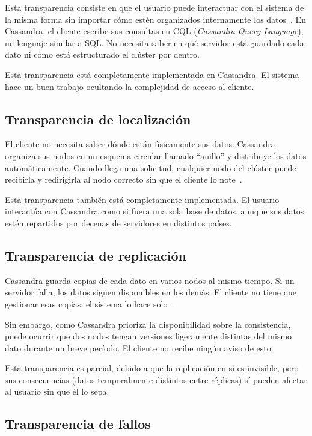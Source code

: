 \documentclass[12pt, a4paper]{article}
\begin{document}
Esta transparencia consiste en que el usuario puede interactuar con el
sistema de la misma forma sin importar cómo estén organizados
internamente los datos~\cite{tanenbaum2007}. En Cassandra, el cliente
escribe sus consultas en CQL (\textit{Cassandra Query Language}), un
lenguaje similar a SQL. No necesita saber en qué servidor está guardado
cada dato ni cómo está estructurado el clúster por dentro.

Esta transparencia está completamente implementada en
Cassandra. El sistema hace un buen trabajo ocultando la complejidad de acceso al cliente.

\newpage
\subsection{Transparencia de localización}

El cliente no necesita saber dónde están físicamente sus datos.
Cassandra organiza sus nodos en un esquema circular llamado ``anillo''
y distribuye los datos automáticamente. Cuando llega una solicitud,
cualquier nodo del clúster puede recibirla y redirigirla al nodo
correcto sin que el cliente lo note~\cite{lakshman2010}.

Esta transparencia también está completamente implementada.
El usuario interactúa con Cassandra como si fuera una sola base de
datos, aunque sus datos estén repartidos por decenas de servidores en
distintos países.

\subsection{Transparencia de replicación}

Cassandra guarda copias de cada dato en varios nodos al mismo tiempo.
Si un servidor falla, los datos siguen disponibles en los demás.
El cliente no tiene que gestionar esas copias: el sistema lo hace
solo~\cite{lakshman2010}.

Sin embargo, como Cassandra prioriza la disponibilidad sobre la
consistencia, puede ocurrir que dos nodos tengan versiones ligeramente
distintas del mismo dato durante un breve período. El cliente no recibe
ningún aviso de esto.

Esta transparencia es parcial, debido a que la replicación en sí es invisible, pero sus consecuencias (datos temporalmente distintos entre
réplicas) sí pueden afectar al usuario sin que él lo sepa.

\subsection{Transparencia de fallos}
\end{document}

